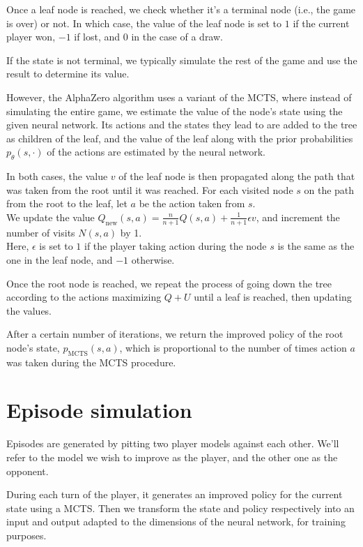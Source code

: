 \documentclass[12pt]{article}
\begin{document}
Once a leaf node is reached, we check whether it's a terminal node (i.e., the
game is over) or not.
In which case, the value of the leaf node is set to $1$ if the current player
won, $-1$ if lost, and $0$ in the case of a draw.

If the state is not terminal, we typically simulate the rest of the game
and use the result to determine its value.

However, the AlphaZero algorithm uses a variant of the MCTS, where instead
of simulating the entire game, we estimate the value of the node's state
using the given neural network.
Its actions and the states they lead to are added to the tree as children of
the leaf, and the value of the leaf along with the prior probabilities
$p_\theta(s, \cdot)$ of the actions are estimated by the neural network.

In both cases, the value $v$ of the leaf node is then propagated along the path
that was taken from the root until it was reached. For each visited node $s$ on
the path from the root to the leaf, let $a$ be the action taken from $s$.
\\
We update the value $Q_{\text{new}}(s,a) = \frac{n}{n+1}Q(s,a) + \frac1{n+1}
\epsilon v$, and increment the number of visits $N(s,a)$ by 1.
\\
Here, $\epsilon$ is set to $1$ if the player taking action during the node $s$
is the same as the one in the leaf node, and $-1$ otherwise.

Once the root node is reached, we repeat the process of going down the tree
according to the actions maximizing $Q+U$ until a leaf is reached, then
updating the values.

After a certain number of iterations, we return the improved policy of the root
node's state, $p_\text{MCTS}(s, a)$, which is proportional to the number of times
action $a$ was taken during the MCTS procedure.

\section{Episode simulation}
Episodes are generated by pitting two player models against each other. We'll
refer to the model we wish to improve as the player, and the other one as the
opponent.

During each turn of the player, it generates an improved policy for the current
state using a MCTS. Then we transform the state and policy respectively into an
input and output adapted to the dimensions of the neural network, for training
purposes.
\end{document}
